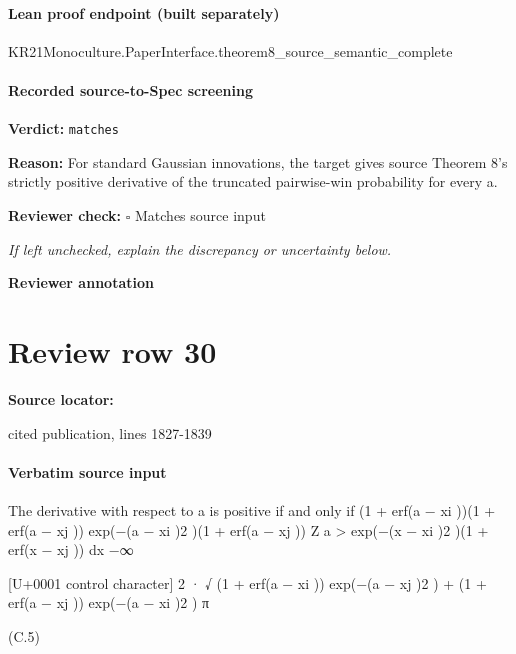 \documentclass[10pt]{article}
\newcommand{\reviewerbox}{%
  \par\noindent\fbox{\parbox{0.96\linewidth}{\rule{0pt}{0.38in}}}\par
}
\newcommand{\reviewmatch}[1]{%
  \par\noindent\textbf{Reviewer check:} $\square$\; #1\par
  \noindent\emph{If left unchecked, explain the discrepancy or uncertainty below.}\par
}
\begin{document}
\paragraph{Lean proof endpoint (built separately)}\begin{ReviewVerbatim}
KR21Monoculture.PaperInterface.theorem8_source_semantic_complete
\end{ReviewVerbatim}

\paragraph{Recorded source-to-Spec screening}
\textbf{Verdict:} \texttt{matches}
\\
{\raggedright
\textbf{Reason:} For standard Gaussian innovations, the target gives source Theorem 8's strictly positive derivative of the truncated pairwise-\allowbreak{}win probability for every a.\allowbreak{}
\par}
\reviewmatch{Matches source input}
\noindent\textbf{Reviewer annotation}\par
\reviewerbox
\clearpage
\hypertarget{source-claim-43364c7dea10aac0}{}
\section*{Review row 30}
\textbf{Source locator:} {\footnotesize\raggedright cited publication, lines 1827-\allowbreak{}1839\par}
\paragraph{Verbatim source input}
\begin{ReviewVerbatim}
The derivative with respect to a is positive if and only if
(1 + erf(a − xi ))(1 + erf(a − xj )) exp(−(a − xi )2 )(1 + erf(a − xj ))
Z a
>
exp(−(x − xi )2 )(1 + erf(x − xj )) dx
−∞

[U+0001 control character]
2
· √ (1 + erf(a − xi )) exp(−(a − xj )2 ) + (1 + erf(a − xj )) exp(−(a − xi )2 )
π

(C.5)
\end{ReviewVerbatim}
\end{document}
